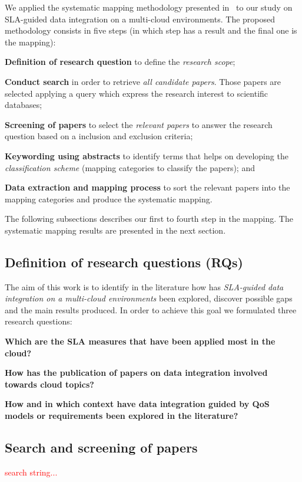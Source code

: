 We applied the systematic mapping methodology presented in~\cite{SM:Petersen:2008} to our study on SLA-guided data integration on a multi-cloud environments. 
The proposed methodology consists in five steps (in which step has a result and the final one is the mapping):
\begin{description}
\item \textbf{Definition of research question} to define the \textit{research scope};
\item \textbf{Conduct search} in order to retrieve \textit{all candidate papers}. Those papers are selected applying a query which express the research interest to scientific databases;
\item  \textbf{Screening of papers} to select the \textit{relevant papers} to answer the research question based on a inclusion and exclusion criteria;
\item \textbf{Keywording using abstracts} to identify terms that helps on developing the \textit{classification scheme} (mapping categories to classify the papers); and
\item \textbf{Data extraction and mapping process} to sort the relevant papers into the mapping categories and produce the systematic mapping.
\end{description}
\bigskip The following subsections describes our first to fourth step in the mapping. The systematic mapping results are presented in the next section.

\subsection{Definition of research questions (RQs)}
The aim of this work is to identify in the literature how has \textit{SLA-guided data integration on a multi-cloud environments} been explored, discover possible gaps and the main results produced.
In order to achieve this goal we formulated three research questions:
\begin{description}
\item \textbf{Which are the SLA measures that have been applied most in the cloud?}
\item \textbf{How has the publication of papers on data integration involved towards cloud topics?}
\item \textbf{How and in which context have data integration guided by QoS models or requirements been explored in the literature?}
\end{description}

\subsection{Search and screening of papers}
\textcolor{red}{search string...}

